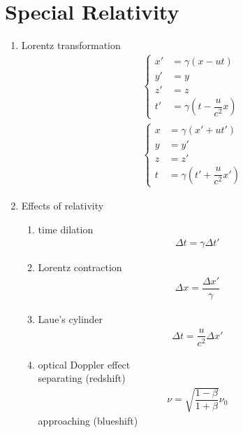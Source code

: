 \documentclass[10.5pt, a4paper, oneside]{article}
\numberwithin{equation}{section}%
\begin{document}



\section{Special Relativity}

\begin{multicols}{2}

\begin{enumerate}
	\item Lorentz transformation
		\begin{align}
		&\left\{\begin{aligned}
		x' &= \gamma (x - u t)\\
		y' &= y\\
		z' &= z\\
		t' &= \gamma (t - \dfrac{u}{c^2}x)
		\end{aligned}\right.
		\\
		&\left\{\begin{aligned}
		x &= \gamma (x' + u t')\\
		y &= y'\\
		z &= z'\\
		t &= \gamma (t' + \dfrac{u}{c^2}x')
		\end{aligned}\right.
		\end{align}
	\item Effects of relativity
		\begin{enumerate}
			\item time dilation
			\begin{align}
				\Delta t = \gamma\Delta t'
			\end{align}
			\item Lorentz contraction
			\begin{align}
				\Delta x = \dfrac{\Delta x'}{\gamma}
			\end{align}
			\item Laue's cylinder
			\begin{align}
				\Delta t = \dfrac{u}{c^2}\Delta x'
			\end{align}
			\item optical Doppler effect\\
			separating (redshift)
			\begin{align}
				\nu = \sqrt{\dfrac{1 - \beta}{1 + \beta}}\nu_0
			\end{align}
			approaching (blueshift)
			\begin{align}

\end{align}
\end{enumerate}
\end{enumerate}
\end{multicols}
\end{document}
